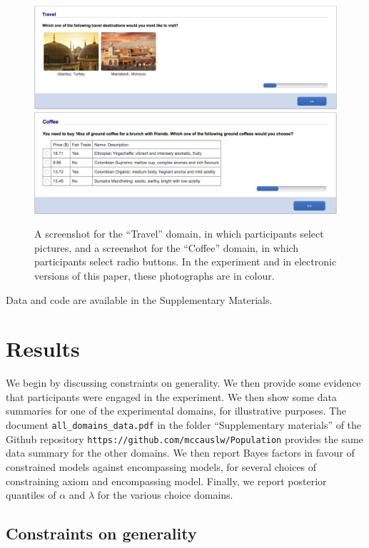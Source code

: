 \documentclass[11pt,letter]{article}
\begin{document}
\begin{figure}
	\centering
	\includegraphics[width=15cm]{screenshot_travel.png}
	\includegraphics[width=15cm]{screenshot_coffee.png}
	\caption{A screenshot for the ``Travel'' domain, in which participants select pictures, and a screenshot for the ``Coffee'' domain, in which participants select radio buttons. In the experiment and in electronic versions of this paper, these photographs are in colour.}\label{f:screenshots}
\end{figure}

Data and code are available in the Supplementary Materials.

\section{Results}\label{s:results}

We begin by discussing constraints on generality.
We then provide some evidence that participants were engaged in the experiment.
We then show some data summaries for one of the experimental domains, for illustrative purposes.
The document \texttt{all\_domains\_data.pdf} in the folder ``Supplementary materials'' of the Github repository \texttt{https://github.com/mccauslw/Population} provides the same data summary for the other domains.
We then report Bayes factors in favour of constrained models against encompassing models, for several choices of constraining axiom and encompassing model.
Finally, we report posterior quantiles of $\alpha$ and $\lambda$ for the various choice domains.

\subsection{Constraints on generality}
\end{document}
